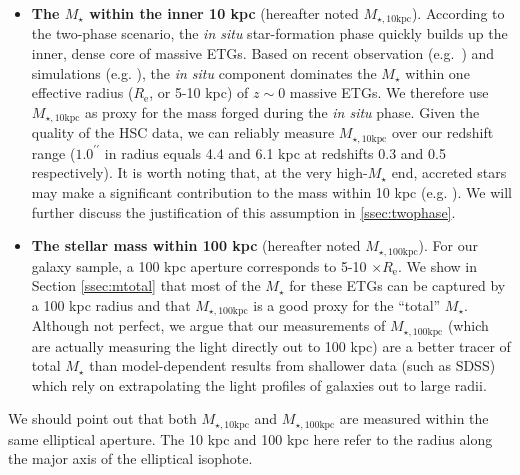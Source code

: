 \documentclass[a4paper,fleqn,usenatbib]{mnras}
\def\arcsec{{\prime\prime}}
\def\mstar{{$M_{\star}$}}
\def\minn{{$M_{\star,10\mathrm{kpc}}$}}
\def\mtot{{$M_{\star,100\mathrm{kpc}}$}}
\begin{document}
    \begin{itemize} 
       
        \item \textbf{The \mstar{} within the inner 10 kpc} 
            (hereafter noted \minn{}). 
            According to the two-phase scenario, the \textit{in situ} star-formation 
            phase quickly builds up the inner, dense core of massive ETGs.  
            Based on recent observation (e.g.~\citealt{vanDokkum2010}) and 
            simulations (e.g. \citealt{RodriguezGomez2016}), the \textit{in situ} 
            component dominates the \mstar{} within one effective radius 
            ($R_{\mathrm{e}}$, or 5-10 kpc) of $z{\sim}0$ massive ETGs.
            We therefore use \minn{} as proxy for the mass forged during the 
            \textit{in situ} phase. 
            Given the quality of the HSC data, we can reliably measure \minn{} over 
            our redshift range ($1.0^{\arcsec}$ in radius equals 4.4 and 6.1 kpc 
            at redshifts 0.3 and 0.5 respectively).  
            It is worth noting that, at the very high-\mstar{} end, accreted stars 
            may make a significant contribution to the mass within 10 kpc 
            (e.g. \citealt{RodriguezGomez2016}). 
            We will further discuss the justification of this assumption in 
            \ref{ssec:twophase}.
            
        \item \textbf{The stellar mass within 100 kpc} 
            (hereafter noted \mtot{}). 
            For our galaxy sample, a 100 kpc aperture corresponds to 5-10 
            $\times R_{\mathrm{e}}$. 
            We show in Section \ref{ssec:mtotal} that most of the \mstar{} for 
            these ETGs can be captured by a 100 kpc radius and that \mtot{} is 
            a good proxy for the ``total'' \mstar{}. 
            Although not perfect, we argue that our measurements of \mtot{} (which are 
            actually measuring the light directly out to 100 kpc) are a better tracer 
            of total \mstar{} than model-dependent results from shallower data 
            (such as SDSS) which rely on extrapolating the light profiles of galaxies 
            out to large radii.
            
       \end{itemize}
       
    We should point out that both \minn{} and \mtot{} are measured within the same 
    elliptical aperture. 
    The 10 kpc and 100 kpc here refer to the radius along the major axis of the 
    elliptical isophote. 
       
\end{document}
